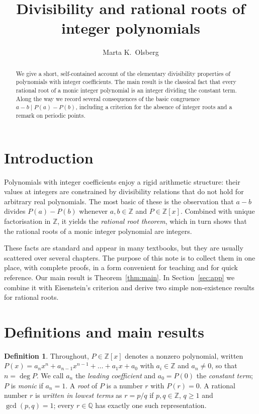 \documentclass[11pt]{amsart}
\title{Divisibility and rational roots of integer polynomials}
\author{Marta K.~Olsberg}
\date{}
\theoremstyle{definition}
\newtheorem{definition}[theorem]{Definition}
\newcommand{\Z}{\mathbb{Z}}
\newcommand{\Q}{\mathbb{Q}}
\begin{document}
\begin{abstract}
We give a short, self-contained account of the elementary divisibility
properties of polynomials with integer coefficients. The main result is the
classical fact that every rational root of a monic integer polynomial is an
integer dividing the constant term. Along the way we record several
consequences of the basic congruence $a-b \mid P(a)-P(b)$, including a
criterion for the absence of integer roots and a remark on periodic points.
\end{abstract}

\maketitle

\section{Introduction}

Polynomials with integer coefficients enjoy a rigid arithmetic structure:
their values at integers are constrained by divisibility relations that do
not hold for arbitrary real polynomials. The most basic of these is the
observation that $a-b$ divides $P(a)-P(b)$ whenever $a,b\in\Z$ and
$P\in\Z[x]$. Combined with unique factorisation in $\Z$, it yields the
\emph{rational root theorem}, which in turn shows that the rational roots of
a monic integer polynomial are integers.

These facts are standard and appear in many textbooks, but they are usually
scattered over several chapters. The purpose of this note is to collect them
in one place, with complete proofs, in a form convenient for teaching and for
quick reference. Our main result is Theorem~\ref{thm:main}. In
Section~\ref{sec:app} we combine it with Eisenstein's criterion and derive two
simple non-existence results for rational roots.

\section{Definitions and main results}

\begin{definition}\label{def:basic}
Throughout, $P\in\Z[x]$ denotes a nonzero polynomial, written
$P(x)=a_nx^n+a_{n-1}x^{n-1}+\dots+a_1x+a_0$ with $a_i\in\Z$ and $a_n\neq 0$,
so that $n=\deg P$. We call $a_n$ the \emph{leading coefficient} and
$a_0=P(0)$ the \emph{constant term}; $P$ is \emph{monic} if $a_n=1$. A
\emph{root} of $P$ is a number $r$ with $P(r)=0$. A rational number $r$ is
\emph{written in lowest terms} as $r=p/q$ if $p,q\in\Z$, $q\geq 1$ and
$\gcd(p,q)=1$; every $r\in\Q$ has exactly one such representation.
\end{definition}
\end{document}
